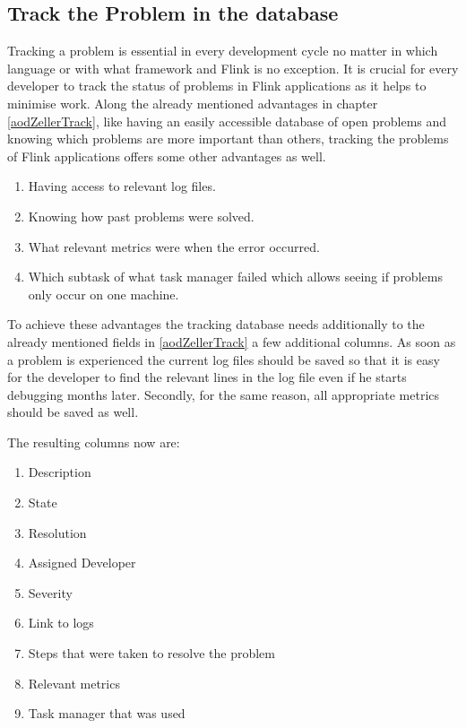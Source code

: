 \subsection{Track the Problem in the database}
Tracking a problem is essential in every development cycle no matter in which language or with what framework and Flink is no exception. It is crucial for every developer to track the status of problems in Flink applications as it helps to minimise work. Along the already mentioned advantages in chapter \ref{aodZellerTrack}, like having an easily accessible database of open problems and knowing which problems are more important than others, tracking the problems of Flink applications offers some other advantages as well.

\begin{enumerate}
  \item Having access to relevant log files.
  \item Knowing how past problems were solved.
  \item What relevant metrics were when the error occurred.
  \item Which subtask of what task manager failed which allows seeing if problems only occur on one machine.
\end{enumerate}

To achieve these advantages the tracking database needs additionally to the already mentioned fields in \ref{aodZellerTrack} a few additional columns. As soon as a problem is experienced the current log files should be saved so that it is easy for the developer to find the relevant lines in the log file even if he starts debugging months later. Secondly, for the same reason, all appropriate metrics should be saved as well.

The resulting columns now are:

\begin{enumerate}
  \item Description
  \item State
  \item Resolution
  \item Assigned Developer
  \item Severity
  \item Link to logs
  \item Steps that were taken to resolve the problem
  \item Relevant metrics
  \item Task manager that was used
\end{enumerate}

